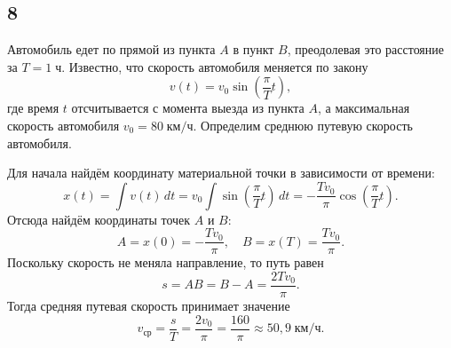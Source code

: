 \subsection{8}

Автомобиль едет по прямой из пункта $A$ в пункт $B$, преодолевая это расстояние за $T=1\;\text{ч}$. Известно, что скорость автомобиля меняется по закону
\[
v(t)=v_0\sin\left(\frac{\pi}{T}t\right),
\]
где время $t$ отсчитывается с момента выезда из пункта $A$, а максимальная скорость автомобиля $v_0=80\;\text{км/ч}$. Определим среднюю путевую скорость автомобиля.

Для начала найдём координату материальной точки в зависимости от времени:
\[
x(t)=\int v(t)\,dt=v_0\int\sin\left(\frac{\pi}{T}t\right)\,dt=-\frac{Tv_0}{\pi}\cos\left(\frac{\pi}{T}t\right).
\]
Отсюда найдём координаты точек $A$ и $B$:
\[
A=x(0)=-\frac{Tv_0}{\pi},\quad B=x(T)=\frac{Tv_0}{\pi}.
\]
Поскольку скорость не меняла направление, то путь равен
\[
s=AB=B-A=\frac{2Tv_0}{\pi}.
\]
Тогда средняя путевая скорость принимает значение
\[
v_\text{ср}=\frac{s}{T}=\frac{2v_0}{\pi}=\frac{160}{\pi}\approx50{,}9\;\text{км/ч}.
\]